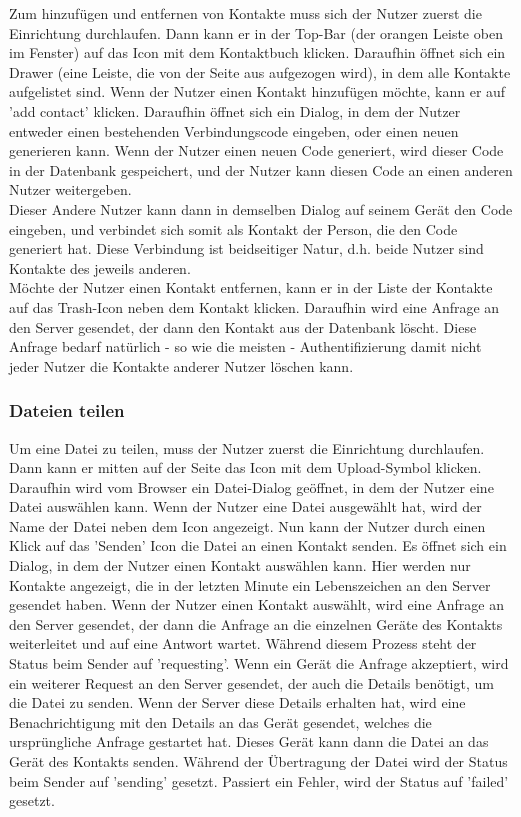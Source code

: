 \documentclass[a4paper]{article}
\begin{document}
Zum hinzufügen und entfernen von Kontakte muss sich der Nutzer zuerst die
Einrichtung durchlaufen. Dann kann er in der Top-Bar (der orangen Leiste oben im
Fenster) auf das Icon mit dem Kontaktbuch klicken. Daraufhin öffnet sich ein
Drawer (eine Leiste, die von der Seite aus aufgezogen wird), in dem alle
Kontakte aufgelistet sind. Wenn der Nutzer einen Kontakt hinzufügen möchte, kann
er auf 'add contact' klicken. Daraufhin öffnet sich ein Dialog, in dem der
Nutzer entweder einen bestehenden Verbindungscode eingeben, oder einen neuen
generieren kann. Wenn der Nutzer einen neuen Code generiert, wird dieser Code in
der Datenbank gespeichert, und der Nutzer kann diesen Code an einen anderen
Nutzer weitergeben.\\
Dieser Andere Nutzer kann dann in demselben Dialog auf seinem Gerät den Code eingeben,
und verbindet sich somit als Kontakt der Person, die den Code generiert hat.
Diese Verbindung ist beidseitiger Natur, d.h. beide Nutzer sind Kontakte des
jeweils anderen.\\
Möchte der Nutzer einen Kontakt entfernen, kann er in der Liste der Kontakte auf
das Trash-Icon neben dem Kontakt klicken. Daraufhin wird eine Anfrage an den
Server gesendet, der dann den Kontakt aus der Datenbank löscht. Diese Anfrage
bedarf natürlich - so wie die meisten - Authentifizierung damit nicht jeder
Nutzer die Kontakte anderer Nutzer löschen kann.



\subsubsection{Dateien teilen}

Um eine Datei zu teilen, muss der Nutzer zuerst die Einrichtung durchlaufen.
Dann kann er mitten auf der Seite das Icon mit dem Upload-Symbol klicken.
Daraufhin wird vom Browser ein Datei-Dialog geöffnet, in dem der Nutzer eine
Datei auswählen kann. Wenn der Nutzer eine Datei ausgewählt hat, wird der Name
der Datei neben dem Icon angezeigt. Nun kann der Nutzer durch einen Klick auf
das 'Senden' Icon die Datei an einen Kontakt senden. Es öffnet sich ein Dialog,
in dem der Nutzer einen Kontakt auswählen kann. Hier werden nur Kontakte
angezeigt, die in der letzten Minute ein Lebenszeichen an den Server gesendet
haben. Wenn der Nutzer einen Kontakt auswählt, wird eine Anfrage an den Server
gesendet, der dann die Anfrage an die einzelnen Geräte des Kontakts weiterleitet
und auf eine Antwort wartet. Während diesem Prozess steht der Status beim
Sender auf 'requesting'. Wenn ein Gerät die Anfrage akzeptiert, wird ein
weiterer Request an den Server gesendet, der auch die Details benötigt, um die
Datei zu senden. Wenn der Server diese Details erhalten hat, wird eine
Benachrichtigung mit den Details an das Gerät gesendet, welches die
ursprüngliche Anfrage gestartet hat. Dieses Gerät kann dann die Datei an das
Gerät des Kontakts senden. Während der Übertragung der Datei wird der Status
beim Sender auf 'sending' gesetzt. Passiert ein Fehler, wird der Status auf
'failed' gesetzt.
\end{document}
